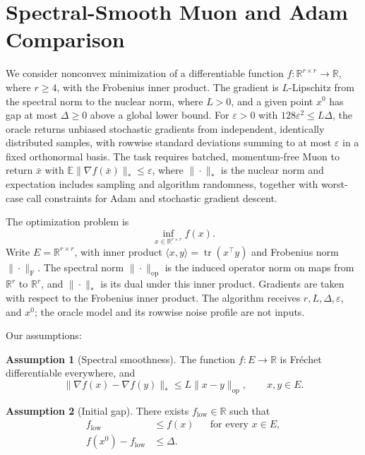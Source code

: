 \documentclass[10pt]{article}
\theoremstyle{definition}
\newtheorem{assumption}{Assumption}
\begin{document}
\section*{Spectral-Smooth Muon and Adam Comparison}
We consider nonconvex minimization of a differentiable function $f:\mathbb{R}^{r\times r}\to\mathbb{R}$, where $r\geq4$, with the Frobenius inner product. The gradient is $L$-Lipschitz from the spectral norm to the nuclear norm, where $L>0$, and a given point $x^0$ has gap at most $\Delta\geq0$ above a global lower bound. For $\varepsilon>0$ with $128\varepsilon^2\leq L\Delta$, the oracle returns unbiased stochastic gradients from independent, identically distributed samples, with rowwise standard deviations summing to at most $\varepsilon$ in a fixed orthonormal basis. The task requires batched, momentum-free Muon to return $\bar{x}$ with $\mathbb{E}\|\nabla f(\bar{x})\|_*\leq\varepsilon$, where $\|\cdot\|_*$ is the nuclear norm and expectation includes sampling and algorithm randomness, together with worst-case call constraints for Adam and stochastic gradient descent.

The optimization problem is
\[
\inf_{x\in\mathbb{R}^{r\times r}} f(x).
\]
Write $E=\mathbb{R}^{r\times r}$, with inner product $\langle x,y\rangle=\operatorname{tr}(x^\top y)$ and Frobenius norm $\|\cdot\|_{\mathrm F}$. The spectral norm $\|\cdot\|_{\mathrm{op}}$ is the induced operator norm on maps from $\mathbb{R}^r$ to $\mathbb{R}^r$, and $\|\cdot\|_*$ is its dual under this inner product. Gradients are taken with respect to the Frobenius inner product. The algorithm receives $r,L,\Delta,\varepsilon$, and $x^0$; the oracle model and its rowwise noise profile are not inputs.

Our assumptions:
\begin{assumption}[Spectral smoothness]
The function $f:E\to\mathbb{R}$ is Fr\'echet differentiable everywhere, and
\[
\|\nabla f(x)-\nabla f(y)\|_*
\leq L\|x-y\|_{\mathrm{op}},
\qquad x,y\in E.
\]
\end{assumption}

\begin{assumption}[Initial gap]
There exists $f_{\mathrm{low}}\in\mathbb{R}$ such that
\[
\begin{aligned}
f_{\mathrm{low}}&\leq f(x) &&\text{for every }x\in E,\\
f(x^0)-f_{\mathrm{low}}&\leq\Delta.
\end{aligned}
\]
\end{assumption}
\end{document}
